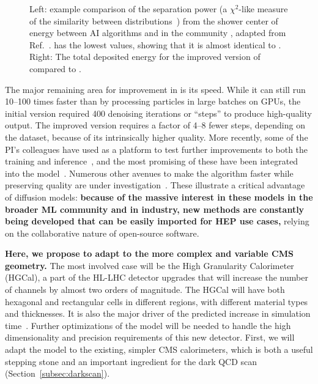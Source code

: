 \begin{figure}[htb!]
\centering
{}
\caption{Left: example comparison of the separation power (a $\chi^2$-like measure of the similarity between distributions~\cite{Diefenbacher:2020rna})
from the shower center of energy between AI algorithms and \GEANTfour in the community \challenge, adapted from Ref.~\cite{Krause:2023mlj}.
\diffu has the lowest values, showing that it is almost identical to \GEANTfour.
Right: The total deposited energy for the improved version of \diffu compared to \GEANTfour.}
\label{fig:calodiffu}
\end{figure}

The major remaining area for improvement in \diffu is its speed.
While it can still run 10--100 times faster than \GEANTfour by processing particles in large batches on GPUs,
the initial version required 400 denoising iterations or ``steps'' to produce high-quality output.
The improved version requires a factor of 4--8 fewer steps, depending on the dataset, because of its intrinsically higher quality.
More recently, some of the PI's colleagues have used \diffu as a platform to test further improvements to both the training and inference~\cite{Jiang:2024ohg},
and the most promising of these have been integrated into the model~\cite{Amram:GitHub}.
Numerous other avenues to make the algorithm faster while preserving quality are under investigation~\cite{Rombach:2022,Song:2023,Mei:2023}.
These illustrate a critical advantage of diffusion models:
\textbf{because of the massive interest in these models in the broader ML community and in industry,
new methods are constantly being developed that can be easily imported for HEP use cases,}
relying on the collaborative nature of open-source software.

\textbf{Here, we propose to adapt \diffu to the more complex and variable CMS geometry.}
The most involved case will be the High Granularity Calorimeter (HGCal), a part of the HL-LHC detector upgrades
that will increase the number of channels by almost two orders of magnitude.
The HGCal will have both hexagonal and rectangular cells in different regions, with different material types and thicknesses.
It is also the major driver of the predicted increase in \GEANTfour simulation time~\cite{Pedro:2020kbk}.
Further optimizations of the \diffu model will be needed to handle the high dimensionality and precision requirements of this new detector.
First, we will adapt the model to the existing, simpler CMS calorimeters,
which is both a useful stepping stone and an important ingredient for the dark QCD scan (Section~\ref{subsec:darkscan}).

